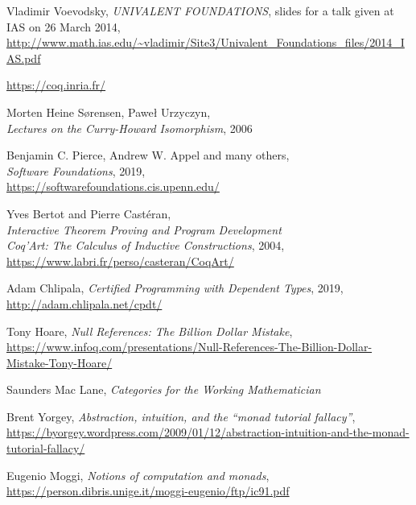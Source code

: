 \documentclass[declaration,inz,english,shortabstract]{iithesis}
\begin{document}
\begin{thebibliography}{1}
        Vladimir Voevodsky,
        \textit{UNIVALENT FOUNDATIONS},
        slides for a talk given at IAS on 26 March 2014, \\
        \url{http://www.math.ias.edu/~vladimir/Site3/Univalent_Foundations_files/2014_IAS.pdf}

        \url{https://coq.inria.fr/}

        Morten Heine Sørensen, Paweł Urzyczyn, \\
        \textit{Lectures on the Curry-Howard Isomorphism}, 2006
    
        Benjamin C. Pierce, Andrew W. Appel and many others, \\
        \textit{Software Foundations}, 2019, \\
        \url{https://softwarefoundations.cis.upenn.edu/}
    
        Yves Bertot and Pierre Castéran, \\
        \textit{Interactive Theorem Proving and Program Development \\ Coq'Art: The Calculus of Inductive Constructions}, 2004, \\
        \url{https://www.labri.fr/perso/casteran/CoqArt/}

        Adam Chlipala,
        \textit{Certified Programming with Dependent Types}, 2019,
        \url{http://adam.chlipala.net/cpdt/}

        Tony Hoare,
        \textit{Null References: The Billion Dollar Mistake}, \\
        \url{https://www.infoq.com/presentations/Null-References-The-Billion-Dollar-Mistake-Tony-Hoare/}
    
        Saunders Mac Lane,
        \textit{Categories for the Working Mathematician}

        Brent Yorgey, \textit{Abstraction, intuition, and the ``monad tutorial fallacy''}, \\
        \url{https://byorgey.wordpress.com/2009/01/12/abstraction-intuition-and-the-monad-tutorial-fallacy/}

        Eugenio Moggi, \textit{Notions of computation and monads}, \\
        \url{https://person.dibris.unige.it/moggi-eugenio/ftp/ic91.pdf}


\end{thebibliography}
\end{document}
